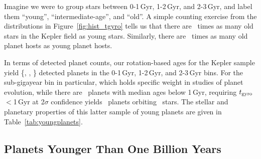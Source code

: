 \documentclass[11pt,twocolumn,tighten]{aastex63}
\begin{document}
Imagine we were to group stars between 0-1\,Gyr, 1-2\,Gyr, and
2-3\,Gyr, and label them ``young'', ``intermediate-age'', and ``old''.
A simple counting exercise from the distributions in
Figure~\ref{fig:hist_tgyro} tells us that there are \ratioobtoybstars\
times as many old stars in the Kepler field as young stars.
Similarly, there are \ratioobtoybplanets\ times as many old planet
hosts as young planet hosts. 

In terms of detected planet counts, our rotation-based ages for
the Kepler sample yield \{\nplyounggyro, \nplmidgyro, \nploldgyro\}
detected planets in the 0-1\,Gyr, 1-2\,Gyr, and 2-3\,Gyr bins.
For the sub-gigayear bin in particular, which holds specific weight in
studies of planet evolution, while there are \nplyounggyro\ planets
with median ages below 1\,Gyr, requiring $t_{\rm
gyro}$$<$1\,Gyr at 2$\sigma$ confidence yields
\nplyounggyrotwosigma\ planets orbiting \nplhostsyounggyrotwosigma\
stars.
The stellar and planetary properties of this latter sample of young
planets are given in Table~\ref{tab:youngplanets}.


\subsection{Planets Younger Than One Billion Years}

%	
%
\end{document}
